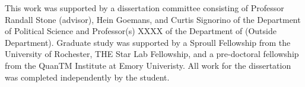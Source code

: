 This work was supported by a dissertation committee consisting of Professor Randall Stone (advisor), Hein Goemans, and Curtis Signorino of the Department of Political Science and Professor(s) XXXX of the Department of (Outside Department).
Graduate study was supported by a Sproull Fellowship from the University of Rochester,
THE Star Lab Fellowship, and a pre-doctoral fellowship from the QuanTM Institute at Emory Univeristy.
All work for the dissertation was completed independently by the student.

